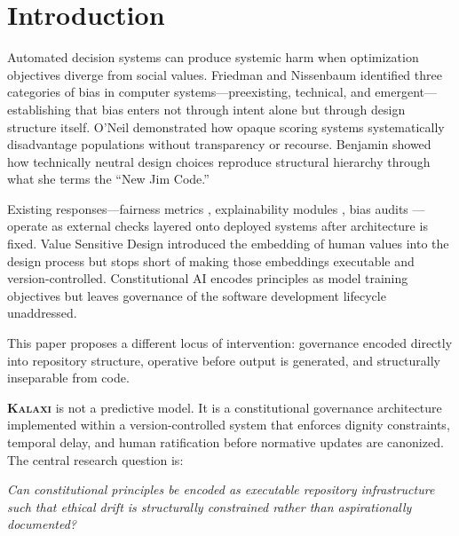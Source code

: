 \documentclass[12pt,a4paper]{article}
\theoremstyle{definition}
\theoremstyle{remark}
\newcommand{\kalaxi}{\textsc{Kalaxi}}
\begin{document}
\newpage
\tableofcontents
\newpage

\section{Introduction}
\label{sec:intro}

Automated decision systems can produce systemic harm when optimization objectives
diverge from social values. Friedman and Nissenbaum \cite{friedman1996} identified
three categories of bias in computer systems—preexisting, technical, and emergent—
establishing that bias enters not through intent alone but through design structure
itself. O'Neil \cite{oneil2016} demonstrated how opaque scoring systems systematically
disadvantage populations without transparency or recourse. Benjamin \cite{benjamin2019}
showed how technically neutral design choices reproduce structural hierarchy through
what she terms the ``New Jim Code.''

Existing responses—fairness metrics \cite{barocas2023}, explainability modules
\cite{ribeiro2016,lundberg2017}, bias audits \cite{barocas2016}—operate as external
checks layered onto deployed systems after architecture is fixed. Value Sensitive
Design \cite{friedman2006,friedman2019} introduced the embedding of human values into
the design process but stops short of making those embeddings executable and
version-controlled. Constitutional AI \cite{bai2022} encodes principles as model
training objectives but leaves governance of the software development lifecycle
unaddressed.

This paper proposes a different locus of intervention: governance encoded directly
into repository structure, operative before output is generated, and structurally
inseparable from code.

\medskip
\noindent\textbf{\kalaxi{}} is not a predictive model. It is a constitutional
governance architecture implemented within a version-controlled system that enforces
dignity constraints, temporal delay, and human ratification before normative updates
are canonized. The central research question is:

\begin{mdframed}[style=canonframe]
\emph{Can constitutional principles be encoded as executable repository infrastructure
such that ethical drift is structurally constrained rather than aspirationally
documented?}
\end{mdframed}
\end{document}
